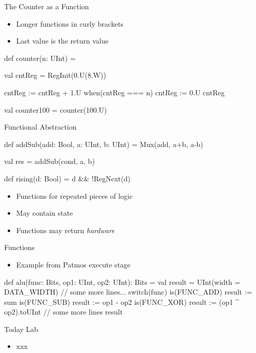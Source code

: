 \begin{frame}[fragile]{The Counter as a Function}
\begin{itemize}
\item Longer functions in curly brackets
\item Last value is the return value
\end{itemize}
\begin{chisel}
def counter(n: UInt) = {
  
  val cntReg = RegInit(0.U(8.W))
  
  cntReg := cntReg + 1.U
  when(cntReg === n) {
    cntReg := 0.U
  }
  cntReg
}

val counter100 = counter(100.U)
\end{chisel}
\end{frame}

\begin{frame}[fragile]{Functional Abstraction}
\begin{chisel}
  def addSub(add: Bool, a: UInt, b: UInt) =
    Mux(add, a+b, a-b)

  val res = addSub(cond, a, b)
  
  def rising(d: Bool) = d && !RegNext(d)
\end{chisel}
\begin{itemize}
\item Functions for repeated pieces of logic
\item May contain state
\item Functions may return \emph{hardware}
\end{itemize}
\end{frame}

\begin{frame}[fragile]{Functions}
\begin{itemize}
\item Example from Patmos execute stage
\end{itemize}
\begin{chisel}
def alu(func: Bits, op1: UInt, op2: UInt): Bits = {
  val result = UInt(width = DATA_WIDTH)
  // some more lines...
  switch(func) {
    is(FUNC_ADD) { result := sum }
    is(FUNC_SUB) { result := op1 - op2 }
    is(FUNC_XOR) { result := (op1 ^ op2).toUInt }
    // some more lines
  }
  result
}
\end{chisel}
\end{frame}

\begin{frame}[fragile]{Today Lab}
\begin{itemize}
\item xxx
\end{itemize}
\end{frame}

